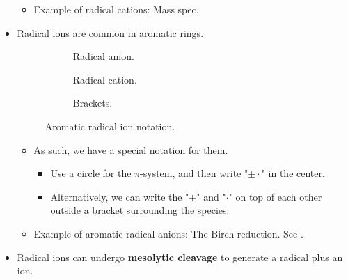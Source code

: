 \documentclass[../notes.tex]{subfiles}
\begin{document}
\begin{itemize}
\begin{itemize}
        \item Example of radical cations: Mass spec.
    \end{itemize}
    \item Radical ions are common in aromatic rings.
    \begin{figure}[h!]
        \centering
        \footnotesize
        \begin{subfigure}[b]{0.2\linewidth}
            \centering
            \caption{Radical anion.}
            \label{fig:radIonArNota}
        \end{subfigure}
        \begin{subfigure}[b]{0.2\linewidth}
            \centering
            \caption{Radical cation.}
            \label{fig:radIonArNotb}
        \end{subfigure}
        \begin{subfigure}[b]{0.2\linewidth}
            \centering
            \caption{Brackets.}
            \label{fig:radIonArNotc}
        \end{subfigure}
        \caption{Aromatic radical ion notation.}
        \label{fig:radIonArNot}
    \end{figure}
    \pagebreak
    \begin{itemize}
        \item As such, we have a special notation for them.
        \begin{itemize}
            \item Use a circle for the $\pi$-system, and then write "$\pm\cdot$" in the center.
            \item Alternatively, we can write the "$\pm$" and "$\cdot$" on top of each other outside a bracket surrounding the species.
        \end{itemize}
        \item Example of aromatic radical anions: The Birch reduction. See \textcite{bib:CHEM22100Notes}.
    \end{itemize}
    \item Radical ions can undergo \textbf{mesolytic cleavage} to generate a radical plus an ion.
    \begin{equation*}

\end{equation*}
\end{itemize}
\end{document}
